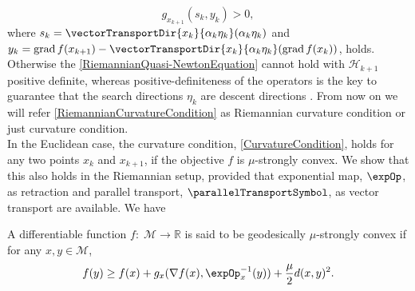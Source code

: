 \begin{equation}\label{RiemannianCurvatureCondition}
    g_{x_{k+1}}(s_k,y_k) > 0,
\end{equation}
where $s_k = \vectorTransportDir{x_k}{\alpha_k \eta_k}(\alpha_k \eta_k)$ and $y_k = \operatorname{grad} f(x_{k+1}) - \vectorTransportDir{x_k}{\alpha_k \eta_k}(\operatorname{grad} f(x_k))$, holds. Otherwise the \cref{RiemannianQuasi-NewtonEquation} cannot hold with $\mathcal{H}_{k+1}$ positive definite, whereas positive-definiteness of the operators is the key to guarantee that the search directions $\eta_k$ are descent directions \cite[p.~54]{Huang:2013}. From now on we will refer \cref{RiemannianCurvatureCondition} as Riemannian curvature condition or just curvature condition.  \\
In the Euclidean case, the curvature condition, \cref{CurvatureCondition}, holds for any two points $x_k$ and $x_{k+1}$, if the objective $f$ is $\mu$-strongly convex. We show that this also holds in the Riemannian setup, provided that exponential map, $\expOp$, as retraction and parallel transport, $\parallelTransportSymbol$, as vector transport are available. We have

\begin{definition}
    A differentiable function $f \colon \; \mathcal{M} \to \mathbb{R}$ is said to be geodesically $\mu$-strongly convex if for any $x,y \in \mathcal{M}$,
    \begin{equation}\label{geodesicallyStronglyConvex}
        f(y) \geq f(x) + g_x (\nabla f(x), {\expOp}^{-1}_{x}(y)) + \frac{\mu}{2} d(x,y)^2.
    \end{equation}    
\end{definition} 

